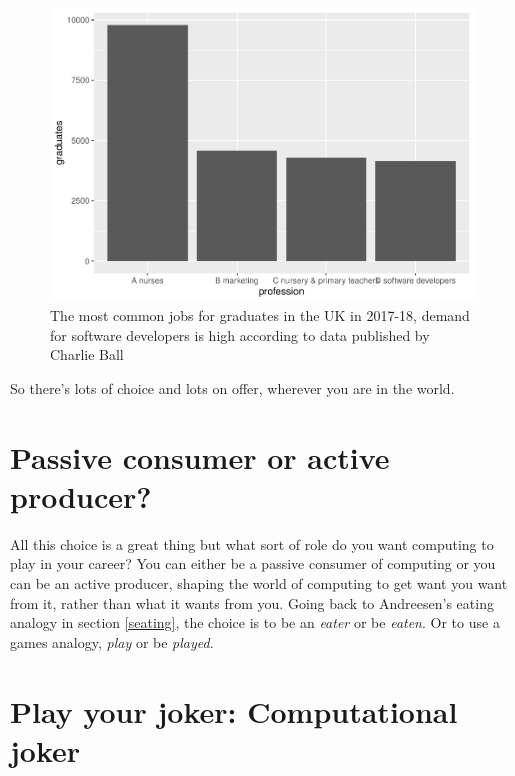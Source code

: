 \documentclass[
]{book}
\begin{document}
\begin{figure}

{\centering \includegraphics[width=1\linewidth]{cdyf_files/figure-latex/nurses-fig-1} 

}

\caption{The most common jobs for graduates in the UK in 2017-18, demand for software developers is high according to data published by Charlie Ball \citep{wonkyball}}\label{fig:nurses-fig}
\end{figure}



So there's lots of choice and lots on offer, wherever you are in the world.

\hypertarget{passive}{%
\section{Passive consumer or active producer?}\label{passive}}

All this choice is a great thing but what sort of role do you want computing to play in your career? You can either be a passive consumer of computing or you can be an active producer, shaping the world of computing to get want you want from it, rather than what it wants from you. Going back to Andreesen's eating analogy in section \ref{seating}, the choice is to be an \emph{eater} or be \emph{eaten}. Or to use a games analogy, \emph{play} or be \emph{played}.

\hypertarget{joker}{%
\section{Play your joker: Computational joker}\label{joker}}
\end{document}
